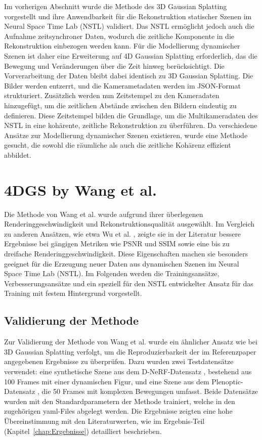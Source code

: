 Im vorherigen Abschnitt wurde die Methode des 3D Gaussian Splatting vorgestellt und ihre Anwendbarkeit für die Rekonstruktion statischer Szenen im Neural Space Time Lab (NSTL) validiert.
Das NSTL ermöglicht jedoch auch die Aufnahme zeitsynchroner Daten, wodurch die zeitliche Komponente in die Rekonstruktion einbezogen werden kann.
Für die Modellierung dynamischer Szenen ist daher eine Erweiterung auf 4D Gaussian Splatting erforderlich, das die Bewegung und Veränderungen über die Zeit hinweg berücksichtigt. Die Vorverarbeitung der Daten bleibt dabei identisch zu 3D Gaussian Splatting.
Die Bilder werden entzerrt, und die Kamerametadaten werden im JSON-Format strukturiert. Zusätzlich werden nun Zeitstempel zu den Kameradaten hinzugefügt, um die zeitlichen Abstände zwischen den Bildern eindeutig zu definieren. 
Diese Zeitstempel bilden die Grundlage, um die Multikameradaten des NSTL in eine kohärente, zeitliche Rekonstruktion zu überführen.
Da verschiedene Ansätze zur Modellierung dynamischer Szenen existieren, wurde eine Methode gesucht, die sowohl die räumliche als auch die zeitliche Kohärenz effizient abbildet. 


\section{4DGS by Wang et al.}

Die Methode von Wang et al. \cite{yang20244dgs} wurde aufgrund ihrer überlegenen Renderinggeschwindigkeit und Rekonstruktionsqualität ausgewählt. Im Vergleich zu anderen Ansätzen, wie etwa Wu et al. \cite{wu20244d}, zeigte sie in der Literatur bessere Ergebnisse bei gängigen Metriken wie PSNR und SSIM sowie eine bis zu dreifache Renderinggeschwindigkeit. Diese Eigenschaften machen sie besonders geeignet für die Erzeugung neuer Daten aus dynamischen Szenen im Neural Space Time Lab (NSTL). Im Folgenden werden die Trainingsansätze, Verbesserungsansätze und ein speziell für den NSTL entwickelter Ansatz für das Training mit festem Hintergrund vorgestellt.

\subsection{Validierung der Methode}
Zur Validierung der Methode von Wang et al. wurde ein ähnlicher Ansatz wie bei 3D Gaussian Splatting verfolgt, um die Reproduzierbarkeit der im Referenzpaper \cite{yang20244dgs} angegebenen Ergebnisse zu überprüfen. Dazu wurden zwei Testdatensätze verwendet: eine synthetische Szene aus dem D-NeRF-Datensatz \cite{pumarola2020dnerf}, bestehend aus 100 Frames mit einer dynamischen Figur, und eine Szene aus dem Plenoptic-Datensatz \cite{li2022neural}, die 50 Frames mit komplexen Bewegungen umfasst.
Beide Datensätze wurden mit den Standardparametern der Methode trainiert, welche in den zugehörigen yaml-Files abgelegt werden. 
Die Ergebnisse zeigten eine hohe Übereinstimmung mit den Literaturwerten, wie im Ergebnis-Teil (Kapitel~\ref{chap:Ergebnisse}) detailliert beschrieben.


